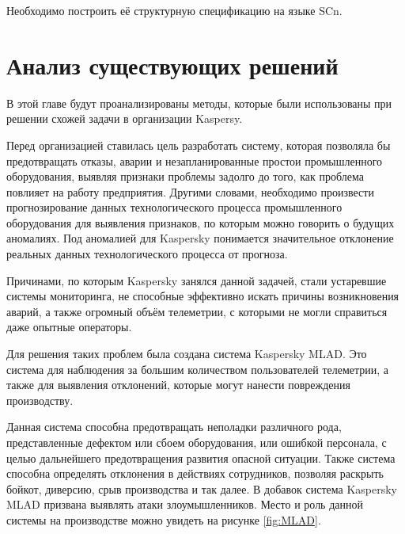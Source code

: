 Необходимо построить её структурную спецификацию на языке SCn.

\section{Анализ существующих решений}

В этой главе будут проанализированы методы, которые были использованы при решении схожей задачи в организации Kaspersy.

Перед организацией ставилась цель разработать систему, которая позволяла бы предотвращать отказы, аварии и незапланированные простои промышленного оборудования, выявляя признаки проблемы задолго до того, как проблема повлияет на работу предприятия. Другими словами, необходимо произвести прогнозирование данных технологического процесса промышленного оборудования для выявления признаков, по которым можно говорить о будущих аномалиях. Под аномалией для Kaspersky понимается значительное отклонение реальных данных технологического процесса от прогноза.

Причинами, по которым Kaspersky занялся данной задачей, стали устаревшие системы мониторинга, не способные эффективно искать причины возникновения аварий, а также огромный объём телеметрии, с которыми не могли справиться даже опытные операторы.

Для решения таких проблем была создана система Kaspersky MLAD. Это система для наблюдения за большим количеством пользователей телеметрии, а также для выявления отклонений, которые могут нанести повреждения производству.

Данная система способна предотвращать неполадки различного рода, представленные дефектом или сбоем оборудования, или ошибкой персонала, с целью дальнейшего предотвращения развития опасной ситуации. Также система способна определять отклонения в действиях сотрудников, позволяя раскрыть бойкот, диверсию, срыв производства и так далее. В добавок система Kaspersky MLAD призвана выявлять атаки злоумышленников. Место и роль данной системы на производстве можно увидеть на рисунке \ref {fig:MLAD}.

